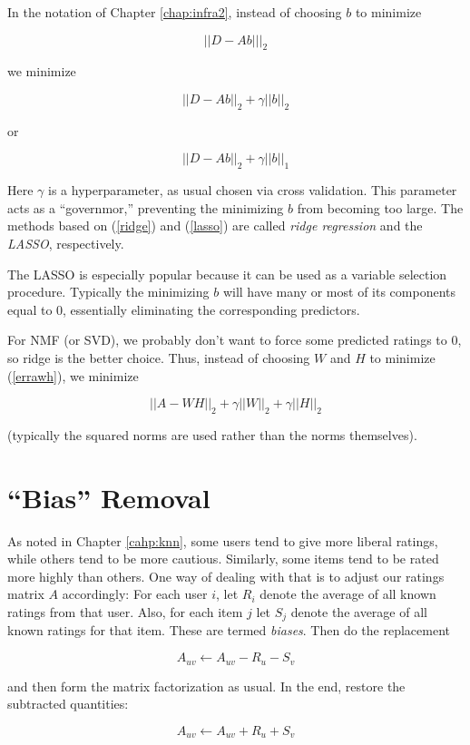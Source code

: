 In the notation of Chapter \ref{chap:infra2}, instead of choosing $b$ to
minimize

\begin{equation}
||D - Ab|||_2
\end{equation}

we minimize

\begin{equation}
\label{ridge}
||D - Ab||_2 + \gamma ||b||_2
\end{equation}

or

\begin{equation}
\label{lasso}
||D - Ab||_2 + \gamma ||b||_1
\end{equation}

Here $\gamma$ is a hyperparameter, as usual chosen via cross validation.
This parameter acts as a ``governmor,'' preventing the minimizing $b$
from becoming too large.  The methods based on (\ref{ridge}) and
(\ref{lasso}) are called \textit{ridge regression} and the
\textit{LASSO}, respectively.

The LASSO is especially popular because it can be used as a variable
selection procedure.  Typically the minimizing $b$ will have many or
most of its components equal to 0, essentially eliminating the
corresponding predictors.

For NMF (or SVD), we probably don't want to force some predicted ratings
to 0, so ridge is the better choice.  Thus, instead of choosing $W$ and
$H$ to minimize (\ref{errawh}), we minimize

\begin{equation}
||A - WH||_2 + \gamma ||W||_2 + \gamma ||H||_2
\end{equation}

(typically the squared norms are used rather than the norms themselves).

\section{``Bias'' Removal}

As noted in Chapter \ref{cahp:knn}, some users tend to give more liberal
ratings, while others tend to be more cautious.  Similarly, some items
tend to be rated more highly than others.  One way of dealing with
that is to adjust our ratings matrix $A$ accordingly:  For each user
$i$, let $R_i$ denote the average of all known ratings from that user.
Also, for each item $j$ let $S_j$ denote the average of all known ratings
for that item.  These are termed \textit{biases}. Then do the replacement

\begin{equation}
A_{uv} \leftarrow A_{uv} - R_u - S_v
\end{equation}

and then form the matrix factorization as usual.  In the end, restore
the subtracted quantities:

\begin{equation}
A_{uv} \leftarrow A_{uv} + R_u + S_v
\end{equation}
